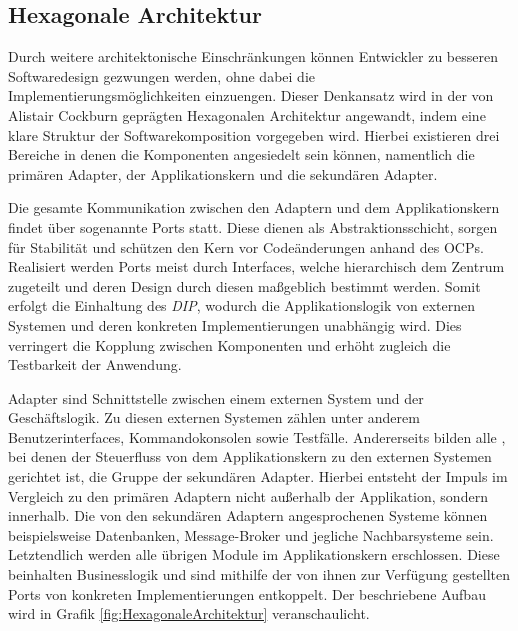 \subsection{Hexagonale Architektur}

Durch weitere architektonische Einschränkungen können Entwickler zu besseren Softwaredesign gezwungen werden, ohne dabei die Implementierungsmöglichkeiten einzuengen. Dieser Denkansatz wird in der von Alistair Cockburn geprägten Hexagonalen Architektur angewandt, indem eine klare Struktur der Softwarekomposition vorgegeben wird. Hierbei existieren drei Bereiche in denen die Komponenten angesiedelt sein können, namentlich die primären Adapter, der Applikationskern und die sekundären Adapter. \cite{Cockburn.Hexagonal}  

Die gesamte Kommunikation zwischen den Adaptern und dem Applikationskern findet über sogenannte Ports statt. Diese dienen als Abstraktionsschicht, sorgen für Stabilität und schützen den Kern vor Codeänderungen anhand des \acrlong{OCP}s. Realisiert werden Ports meist durch Interfaces, welche hierarchisch dem Zentrum zugeteilt und deren Design durch diesen maßgeblich bestimmt werden. Somit erfolgt die Einhaltung des \emph{\acrlong{DIP}}, wodurch die Applikationslogik von externen Systemen und deren konkreten Implementierungen unabhängig wird. Dies verringert die Kopplung zwischen Komponenten und erhöht zugleich die Testbarkeit der Anwendung. \cite{philipbrown.2014}

Adapter sind Schnittstelle zwischen einem externen System und der Geschäftslogik.  Zu diesen externen Systemen zählen unter anderem Benutzerinterfaces, Kommandokonsolen sowie Testfälle. Andererseits bilden alle , bei denen der Steuerfluss von dem Applikationskern zu den externen Systemen gerichtet ist, die Gruppe der sekundären Adapter. Hierbei entsteht der Impuls im Vergleich zu den primären Adaptern nicht außerhalb der Applikation, sondern innerhalb. Die von den sekundären Adaptern angesprochenen Systeme können beispielsweise Datenbanken, Message-Broker und jegliche Nachbarsysteme sein. Letztendlich werden alle übrigen Module im Applikationskern erschlossen. Diese beinhalten Businesslogik und sind mithilfe der von ihnen zur Verfügung gestellten Ports von konkreten Implementierungen entkoppelt. \cite{hgraca.2017, Griffin.2021b} Der beschriebene Aufbau wird in Grafik \ref{fig:HexagonaleArchitektur} veranschaulicht. 

